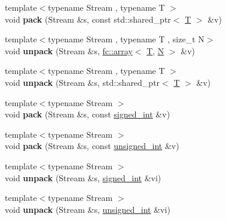 \begin{DoxyCompactItemize}
\item 
\mbox{\label{namespacefc_1_1raw_ae1b62844599094cfab6fe3c2e7de874f}} 
{\footnotesize template$<$typename Stream , typename T $>$ }\\void {\bfseries pack} (Stream \&s, const std\+::shared\+\_\+ptr$<$ \mbox{\hyperlink{struct_t}{T}} $>$ \&v)
\item 
\mbox{\label{namespacefc_1_1raw_a87c6bb0bb299e23a43cffbc4d0538778}} 
{\footnotesize template$<$typename Stream , typename T , size\+\_\+t N$>$ }\\void {\bfseries unpack} (Stream \&s, \mbox{\hyperlink{classfc_1_1array}{fc\+::array}}$<$ \mbox{\hyperlink{struct_t}{T}}, \mbox{\hyperlink{group__types_gaf9c1edb0e0da55ec6ba09f32f6839529}{N}} $>$ \&v)
\item 
\mbox{\label{namespacefc_1_1raw_ae9e67781856476d6e2d8ebf53ffe5b37}} 
{\footnotesize template$<$typename Stream , typename T $>$ }\\void {\bfseries unpack} (Stream \&s, std\+::shared\+\_\+ptr$<$ \mbox{\hyperlink{struct_t}{T}} $>$ \&v)
\item 
\mbox{\label{namespacefc_1_1raw_aaf86a368b41fd7387e650118dc76c16b}} 
{\footnotesize template$<$typename Stream $>$ }\\void {\bfseries pack} (Stream \&s, const \mbox{\hyperlink{structfc_1_1signed__int}{signed\+\_\+int}} \&v)
\item 
\mbox{\label{namespacefc_1_1raw_a2b6c821f8272feaf148c356afed9be10}} 
{\footnotesize template$<$typename Stream $>$ }\\void {\bfseries pack} (Stream \&s, const \mbox{\hyperlink{structfc_1_1unsigned__int}{unsigned\+\_\+int}} \&v)
\item 
\mbox{\label{namespacefc_1_1raw_ad5cc23c416b00f91554e0113d4c2f228}} 
{\footnotesize template$<$typename Stream $>$ }\\void {\bfseries unpack} (Stream \&s, \mbox{\hyperlink{structfc_1_1signed__int}{signed\+\_\+int}} \&vi)
\item 
\mbox{\label{namespacefc_1_1raw_a7c53fc63be442d31d37a942231f23954}} 
{\footnotesize template$<$typename Stream $>$ }\\void {\bfseries unpack} (Stream \&s, \mbox{\hyperlink{structfc_1_1unsigned__int}{unsigned\+\_\+int}} \&vi)

\end{DoxyCompactItemize}
